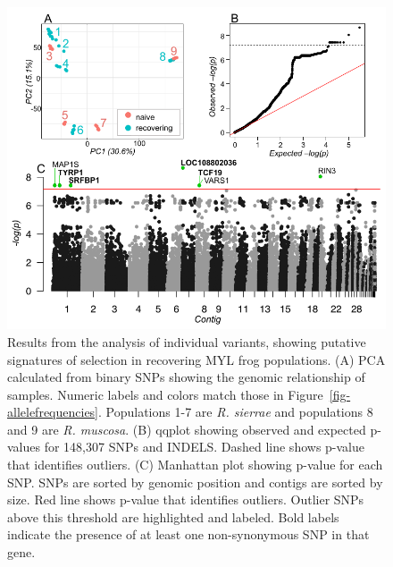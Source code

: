 \documentclass[
  letterpaper,
  DIV=11,
  numbers=noendperiod]{scrartcl}
\begin{document}
\begin{figure}

{\centering \includegraphics[width=5.72917in,height=\textheight]{figures/pca_qq_manhattan.png}

}

\caption{\label{fig-selectionresults}Results from the analysis of
individual variants, showing putative signatures of selection in
recovering MYL frog populations. (A) PCA calculated from binary SNPs
showing the genomic relationship of samples. Numeric labels and colors
match those in Figure~\ref{fig-allelefrequencies}. Populations 1-7 are
\emph{R. sierrae} and populations 8 and 9 are \emph{R. muscosa}. (B)
qqplot showing observed and expected p-values for 148,307 SNPs and
INDELS. Dashed line shows p-value that identifies outliers. (C)
Manhattan plot showing p-value for each SNP. SNPs are sorted by genomic
position and contigs are sorted by size. Red line shows p-value that
identifies outliers. Outlier SNPs above this threshold are highlighted
and labeled. Bold labels indicate the presence of at least one
non-synonymous SNP in that gene.}

\end{figure}

\newpage
\end{document}
